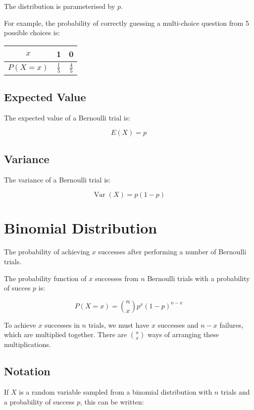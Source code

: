 \documentclass[a4paper,11pt]{article}
\DeclareMathOperator\Var{Var}
\begin{document}
The distribution is parameterised by $p$.

For example, the probability of correctly guessing a multi-choice question from
5 possible choices is:

\begin{center}
\begin{tabular}{c|c|c}
$x$ & 1 & 0 \\
\hline
$P(X = x)$ & $\frac{1}{5}$ & $\frac{4}{5}$ \\
\end{tabular}
\end{center}


\subsection{Expected Value}

The expected value of a Bernoulli trial is:

$$
E(X) = p
$$


\subsection{Variance}

The variance of a Bernoulli trial is:

$$
\Var(X) = p(1 - p)
$$




\section{Binomial Distribution}

The probability of achieving $x$ successes after performing a number of
Bernoulli trials.

The probability function of $x$ successes from $n$ Bernoulli trials with a
probability of succes $p$ is:

$$
P(X = x) = \binom{n}{x} p^x (1 - p)^{n - x}
$$

To achieve $x$ successes in $n$ trials, we must have $x$ successes and $n - x$
failures, which are multiplied together. There are $\binom{n}{x}$ ways of
arranging these multiplications.


\subsection{Notation}

If $X$ is a random variable sampled from a binomial distribution with $n$
trials and a probability of success $p$, this can be written:
\end{document}
